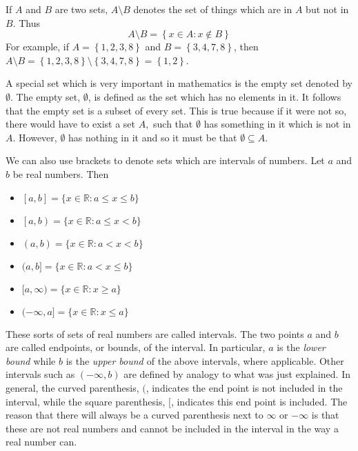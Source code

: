 If $A$ and $B$ are two sets, $A\setminus B$ \index{$\setminus$}denotes the set of things which
are in $A$ but not in $B.$ Thus
\begin{equation*}
A\setminus B =  \left\{ x\in A:x\notin B\right\} 
\end{equation*}
For example, if $A = \left\{1,2,3,8 \right\}$ and $B = \left\{ 3,4,7,8 \right\}$, then $A \setminus B = \left\{ 1,2,3,8\right\} \setminus 
\left\{ 3,4,7,8 \right\} =\left\{1,2 \right\}$.

A special set which is very important in mathematics is the empty set
 denoted by $\emptyset .$ The empty set, $\emptyset $, is
defined as the set which has no elements in it. It follows that the empty set is a subset of every set. 
This is true because if it were not so, there would have to exist a set $A,$ such that $\emptyset $
has something in it which is not in $A.$ However, $\emptyset $ has nothing
in it and so it must be that $\emptyset \subseteq A.$

We can also use brackets to denote sets which are intervals of numbers. Let $a$ and $b$ be real numbers. Then

\begin{itemize}
\item
$\left[ a,b\right] = \{x \in \mathbb{R}: a\leq x\leq b \}$

\item $\left[a,b \right) = \{x \in \mathbb{R}: a\leq x<b \}$ 

\item $\left( a,b\right) = \{x \in \mathbb{R}: a<x<b \}$ 

\item $(a,b] = \{ x \in \mathbb{R}: a<x\leq b \}$

\item  $[a,\infty ) = \{x \in \mathbb{R}: x\geq a \}$ 

\item $(-\infty ,a] = \{x \in \mathbb{R}: x \leq a \}$ 
\end{itemize}

These sorts of sets of real
numbers are called intervals. The two points $a$ and $b$ are called
endpoints, or bounds, of the interval. In particular, $a$ is the {\em lower bound \em}  while $b$ is the {\em upper bound \em} of the above
intervals, where applicable.
 Other intervals such as $\left( -\infty ,b\right) $
are defined by analogy to what was just explained.
 In general, the curved
parenthesis, $($, indicates the end point is not included in the interval, while
the square parenthesis, $[$, indicates this end point is included. The reason that
there will always be a curved parenthesis next to $\infty $ or $-\infty $ is
that these are not real numbers and cannot be included in the interval in the way a real number can. 

